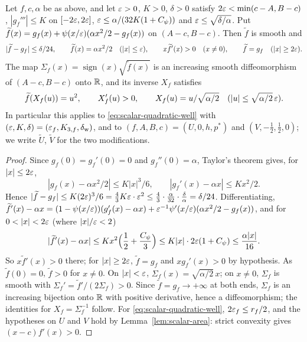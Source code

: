 \begin{lemma}\label{lem:scalar-wells}
Let $f,c,\alpha$ be as above, and let $\varepsilon>0$, $K>0$, $\delta>0$ satisfy $2\varepsilon<\min(c-A,B-c)$,
$|g_f'''|\le K$ on $[-2\varepsilon,2\varepsilon]$, $\varepsilon\le\alpha/(32K(1+C_\psi))$ and $\varepsilon\le\sqrt{\delta/\alpha}$. Put
$\widetilde f(x)=g_f(x)+\psi(x/\varepsilon)(\alpha x^2/2-g_f(x))$ on $(A-c,B-c)$. Then $\widetilde f$ is smooth and
\[
 |\widetilde f-g_f|\le\delta/24,\qquad
 \widetilde f(x)=\alpha x^2/2\quad(|x|\le\varepsilon),\qquad
 x\widetilde f'(x)>0\quad(x\ne0),\qquad \widetilde f=g_f\quad(|x|\ge2\varepsilon).
\]
The map $\Sigma_f(x)=\operatorname{sign}(x)\sqrt{\widetilde f(x)}$ is an increasing smooth diffeomorphism of
$(A-c,B-c)$ onto $\mathbb{R}$, and its inverse $X_f$ satisfies
\[
 \widetilde f(X_f(u))=u^2,\qquad X_f'(u)>0,\qquad
 X_f(u)=u/\sqrt{\alpha/2}\quad(|u|\le\sqrt{\alpha/2}\,\varepsilon).
\]
In particular this applies to \eqref{eq:scalar-quadratic-well} with $(\varepsilon,K,\delta)=(\varepsilon_f,K_{3,f},\delta_{\rm w})$,
and to $(f,A,B,c)=(U,0,h,p^*)$ and $(V,-\frac12,\frac12,0)$; we write $\widetilde U$, $\widetilde V$ for the two
modifications.
{\normalfont {}}
\end{lemma}

\begin{proof}
Since $g_f(0)=g_f'(0)=0$ and $g_f''(0)=\alpha$, Taylor's theorem gives, for $|x|\le2\varepsilon$,
\[
 |g_f(x)-\alpha x^2/2|\le K|x|^3/6,\qquad |g_f'(x)-\alpha x|\le Kx^2/2 .
\]
Hence $|\widetilde f-g_f|\le K(2\varepsilon)^3/6=\frac43K\varepsilon\cdot\varepsilon^2\le\frac43\cdot\frac\alpha{32}\cdot\frac\delta\alpha
=\delta/24$. Differentiating,
$\widetilde f'(x)-\alpha x=(1-\psi(x/\varepsilon))(g_f'(x)-\alpha x)+\varepsilon^{-1}\psi'(x/\varepsilon)(\alpha x^2/2-g_f(x))$, and for
$0<|x|<2\eps$ (where $|x|/\varepsilon<2$)
\[
 |\widetilde f'(x)-\alpha x|\le Kx^2\Bigl(\frac12+\frac{C_\psi}3\Bigr)\le K|x|\cdot2\varepsilon(1+C_\psi)\le\frac{\alpha|x|}{16}.
\]
So $x\widetilde f'(x)>0$ there; for $|x|\ge2\varepsilon$, $\widetilde f=g_f$ and $xg_f'(x)>0$ by hypothesis. As
$\widetilde f(0)=0$, $\widetilde f>0$ for $x\ne0$. On $|x|<\varepsilon$, $\Sigma_f(x)=\sqrt{\alpha/2}\,x$; on $x\ne0$,
$\Sigma_f$ is smooth with $\Sigma_f'=\widetilde f'/(2\Sigma_f)>0$. Since $\widetilde f=g_f\to+\infty$ at both ends,
$\Sigma_f$ is an increasing bijection onto $\mathbb{R}$ with positive derivative, hence a diffeomorphism; the identities for
$X_f=\Sigma_f^{-1}$ follow. For \eqref{eq:scalar-quadratic-well}, $2\varepsilon_f\le r_f/2$, and the hypotheses on $U$
and $V$ hold by Lemma~\ref{lem:scalar-area}: strict convexity gives $(x-c)f'(x)>0$.
\end{proof}

